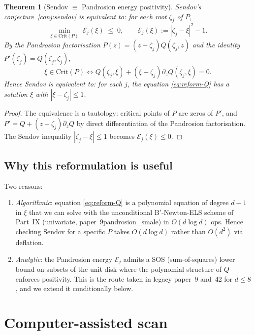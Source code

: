 \documentclass[11pt,a4paper]{article}
\newtheorem{theorem}{Theorem}[section]
\begin{document}
\begin{theorem}[Sendov $\equiv$ Pandrosion energy positivity]\label{thm:reform}
Sendov's conjecture~\ref{conj:sendov} is equivalent to: for each root $\zeta_j$ of $P$,
\begin{equation}\label{eq:reform}
\min_{\xi \in \mathrm{Crit}(P)} \; \mathcal E_j(\xi) \;\le\; 0, \qquad \mathcal E_j(\xi) := |\zeta_j - \xi|^2 - 1.
\end{equation}
By the Pandrosion factorisation $P(z) = (z - \zeta_j) Q(\zeta_j, z)$ and the identity $P'(\zeta_j) = Q(\zeta_j, \zeta_j)$,
\begin{equation}\label{eq:reform-Q}
\xi \in \mathrm{Crit}(P) \iff Q(\zeta_j, \xi) + (\xi - \zeta_j) \partial_z Q(\zeta_j, \xi) = 0.
\end{equation}
Hence Sendov is equivalent to: for each $j$, the equation \eqref{eq:reform-Q} has a solution $\xi$ with $|\xi - \zeta_j| \le 1$.
\end{theorem}

\begin{proof}
The equivalence is a tautology: critical points of $P$ are zeros of $P'$, and $P' = Q + (z - \zeta_j) \partial_z Q$ by direct differentiation of the Pandrosion factorisation. The Sendov inequality $|\zeta_j - \xi| \le 1$ becomes $\mathcal E_j(\xi) \le 0$.
\end{proof}

\subsection{Why this reformulation is useful}

Two reasons:
\begin{enumerate}
\item \emph{Algorithmic}: equation \eqref{eq:reform-Q} is a polynomial equation of degree $d - 1$ in $\xi$ that we can solve with the unconditional B$'$-Newton-ELS scheme of Part~IX (univariate, paper~9pandrosion\_smale) in $O(d \log d)$ ops. Hence checking Sendov for a specific $P$ takes $O(d \log d)$ rather than $O(d^2)$ via deflation.

\item \emph{Analytic}: the Pandrosion energy $\mathcal E_j$ admits a SOS (sum-of-squares) lower bound on subsets of the unit disk where the polynomial structure of $Q$ enforces positivity. This is the route taken in legacy paper~9 and~42 for $d \le 8$, and we extend it conditionally below.
\end{enumerate}

\section{Computer-assisted scan}\label{sec:scan}
\end{document}
